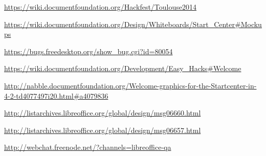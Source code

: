 \documentclass{article}
\begin{document}
\begin{thebibliography}{30}
    \url{https://wiki.documentfoundation.org/Hackfest/Toulouse2014}

    \url{https://wiki.documentfoundation.org/Design/Whiteboards/Start_Center#Mockups}

    \url{https://bugs.freedesktop.org/show_bug.cgi?id=80054}

    \url{https://wiki.documentfoundation.org/Development/Easy_Hacks#Welcome}

    \url{http://nabble.documentfoundation.org/Welcome-graphics-for-the-Startcenter-in-4-2-td4077497i20.html#a4079836}

    \url{http://listarchives.libreoffice.org/global/design/msg06660.html}

    \url{http://listarchives.libreoffice.org/global/design/msg06657.html}

    \url{http://webchat.freenode.net/?channels=libreoffice-qa}

\end{thebibliography}
\end{document}
